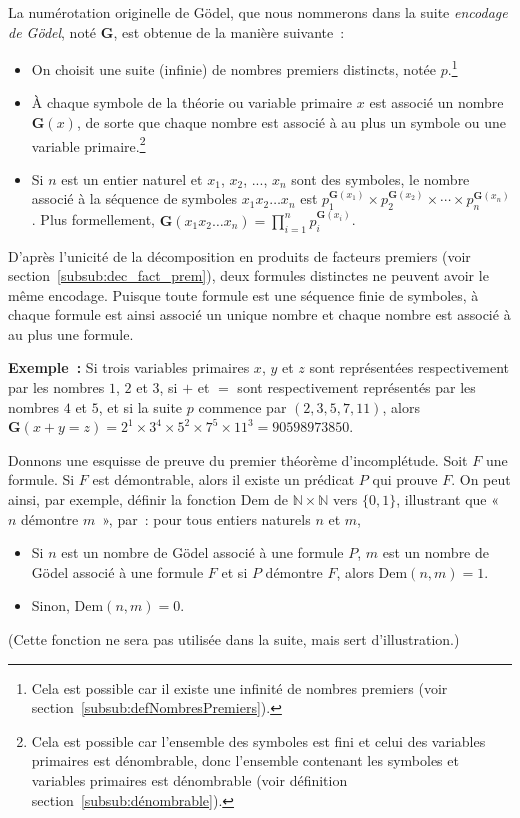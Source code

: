 La numérotation originelle de Gödel, que nous nommerons dans la suite \textit{encodage de Gödel}, noté $\mathbf{G}$, est obtenue de la manière suivante : 
\begin{itemize}[nosep]
    \item On choisit une suite (infinie) de nombres premiers distincts, notée $p$.\footnote{Cela est possible car il existe une infinité de nombres premiers (voir section~\ref{subsub:defNombresPremiers}).}
    \item À chaque symbole de la théorie ou variable primaire $x$ est associé un nombre $\mathbf{G}(x)$, de sorte que chaque nombre est associé à au plus un symbole ou une variable primaire.\footnote{Cela est possible car l'ensemble des symboles est fini et celui des variables primaires est dénombrable, donc l'ensemble contenant les symboles et variables primaires est dénombrable (voir définition section~\ref{subsub:dénombrable}).}
    \item Si $n$ est un entier naturel et $x_1$, $x_2$, ..., $x_n$ sont des symboles, le nombre associé à la séquence de symboles $x_1 x_2 \dots x_n$ est $p_1^{\mathbf{G}(x_1)} \times p_2^{\mathbf{G}(x_2)} \times \cdots \times p_n^{\mathbf{G}(x_n)}$.
        Plus formellement, $\mathbf{G}(x_1 x_2 \dots x_n) = \prod_{i=1}^n p_i^{\mathbf{G}(x_i)}$. 
\end{itemize}
D'après l'unicité de la décomposition en produits de facteurs premiers (voir section~\ref{subsub:dec_fact_prem}), deux formules distinctes ne peuvent avoir le même encodage.
Puisque toute formule est une séquence finie de symboles, à chaque formule est ainsi associé un unique nombre et chaque nombre est associé à au plus une formule.

\medskip

\noindent \textbf{Exemple :} Si trois variables primaires $x$, $y$ et $z$ sont représentées respectivement par les nombres $1$, $2$ et $3$, si $+$ et $=$ sont respectivement représentés par les nombres $4$ et $5$, et si la suite $p$ commence par $(2, 3, 5, 7, 11)$, alors $\mathbf{G}(x + y = z) = 2^1 \times 3^4 \times 5^2 \times 7^5 \times 11^3 = 90598973850$.

\medskip

\noindent Donnons une esquisse de preuve du premier théorème d'incomplétude.
Soit $F$ une formule. 
Si $F$ est démontrable, alors il existe un prédicat $P$ qui prouve $F$. 
On peut ainsi, par exemple, définir la fonction $\mathrm{Dem}$ de $\mathbb{N} \times \mathbb{N}$ vers $\lbrace 0, 1 \rbrace$, illustrant que « $n$ démontre $m$ », par : pour tous entiers naturels $n$ et $m$, 
\begin{itemize}[nosep]
    \item Si $n$ est un nombre de Gödel associé à une formule $P$, $m$ est un nombre de Gödel associé à une formule $F$ et si $P$ démontre $F$, alors $\mathrm{Dem}(n, m) = 1$.
    \item Sinon, $\mathrm{Dem}(n, m) = 0$. 
\end{itemize}
(Cette fonction ne sera pas utilisée dans la suite, mais sert d'illustration.)

